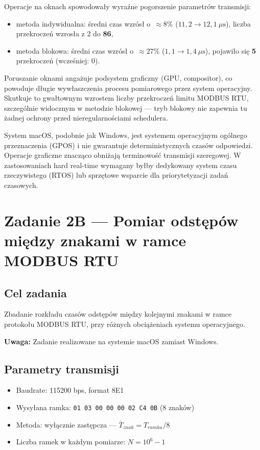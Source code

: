 \documentclass[12pt,a4paper]{article}
\begin{document}
Operacje na oknach spowodowały wyraźne pogorszenie parametrów transmisji:
\begin{itemize}
    \item metoda indywidualna: średni czas wzrósł o~$\approx 8\%$
          ($11{,}2 \to 12{,}1\ \mu\text{s}$), liczba przekroczeń wzrosła z 2 do \textbf{86},
    \item metoda blokowa: średni czas wzrósł o~$\approx 27\%$
          ($1{,}1 \to 1{,}4\ \mu\text{s}$), pojawiło się \textbf{5} przekroczeń
          (wcześniej: 0).
\end{itemize}
Poruszanie oknami angażuje podsystem graficzny (GPU, compositor), co powoduje
długie wywłaszczenia procesu pomiarowego przez system operacyjny.
Skutkuje to gwałtownym wzrostem liczby przekroczeń limitu MODBUS RTU,
szczególnie widocznym w metodzie blokowej — tryb blokowy nie zapewnia tu
żadnej ochrony przed nieregularnościami schedulera.

System macOS, podobnie jak Windows, jest systemem operacyjnym ogólnego
przeznaczenia (GPOS) i nie gwarantuje deterministycznych czasów odpowiedzi.
Operacje graficzne znacząco obniżają terminowość transmisji szeregowej.
W zastosowaniach hard real-time wymagany byłby dedykowany system czasu
rzeczywistego (RTOS) lub sprzętowe wsparcie dla priorytetyzacji zadań czasowych.

\section*{Zadanie 2B — Pomiar odstępów między znakami w ramce MODBUS RTU}

\subsection*{Cel zadania}

Zbadanie rozkładu czasów odstępów między kolejnymi znakami w ramce protokołu
MODBUS RTU, przy różnych obciążeniach systemu operacyjnego.

\textbf{Uwaga:} Zadanie realizowane na systemie macOS zamiast Windows.

\subsection*{Parametry transmisji}

\begin{itemize}
    \item Baudrate: 115200 bps, format 8E1
    \item Wysyłana ramka: \texttt{01 03 00 00 00 02 C4 0B} (8 znaków)
    \item Metoda: wyłącznie zastępcza — $\bar{T}_{znak} = T_{ramka} / 8$
    \item Liczba ramek w każdym pomiarze: $N = 10^6 - 1$
\end{itemize}
\end{document}
